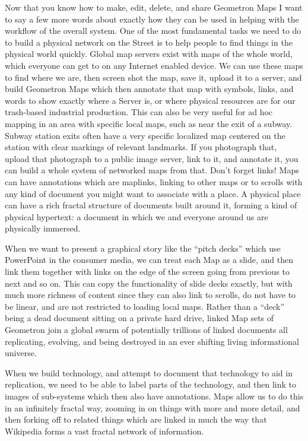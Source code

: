 Now that you know how to make, edit, delete, and share Geometron Maps I want to say a few more words about exactly how they can be used in helping with the workflow of the overall system.  One of the most fundamental tasks we need to do to build a physical network on the Street is to help people to find things in the physical world quickly.  Global map servers exist with maps of the whole world, which everyone can get to on any Internet enabled device.  We can use these maps to find where we are, then screen shot the map, save it, upload it to a server, and build Geometron Maps which then annotate that map with symbols, links, and words to show exactly where a Server is, or where physical resources are for our trash-based industrial production.  This can also be very useful for ad hoc mapping in an area with specific local maps, such as near the exit of a subway.  Subway station exits often have a very specific localized map centered on the station with clear markings of relevant landmarks. If you photograph that, upload that photograph to a public image server, link to it, and annotate it, you can build a whole system of networked maps from that.  Don't forget links!  Maps can have annotations which are maplinks, linking to other maps or to scrolls with any kind of document you might want to associate with a place.  A physical place can have a rich fractal structure of documents built around it, forming a kind of physical hypertext: a document in which we and everyone around us are physically immersed.

When we want to present a graphical story like the ``pitch decks'' which use PowerPoint in the consumer media, we can treat each Map as a slide, and then link them together with links on the edge of the screen going from previous to next and so on.  This can copy the functionality of slide decks exactly, but with much more richness of content since they can also link to scrolls, do not have to be linear, and are not restricted to loading local maps.  Rather than a ``deck'' being a dead document sitting on a private hard drive, linked Map sets of Geometron join a global swarm of potentially trillions of linked documents all replicating, evolving, and being destroyed in an ever shifting living informational universe.

When we build technology, and attempt to document that technology to aid in replication, we need to be able to label parts of the technology, and then link to images of sub-systems which then also have annotations.  Maps allow us to do this in an infinitely fractal way, zooming in on things with more and more detail, and then forking off to related things which are linked in much the way that Wikipedia forms a vast fractal network of information.  

